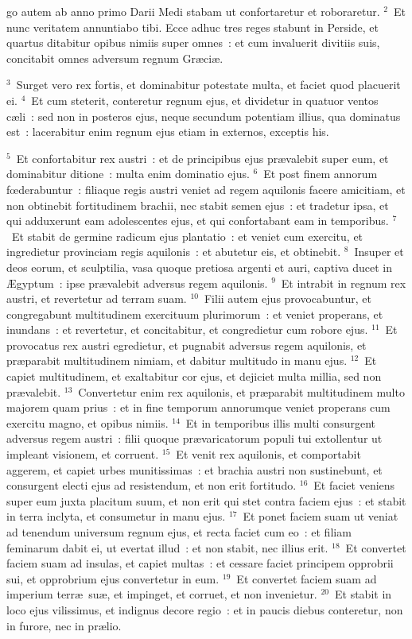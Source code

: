 \bchapter
{}go autem ab anno primo Darii Medi stabam ut confortaretur et roboraretur.
${}^{2}$~Et nunc veritatem annuntiabo tibi. Ecce adhuc tres reges stabunt in Perside, et quartus ditabitur opibus nimiis super omnes~: et cum invaluerit divitiis suis, concitabit omnes adversum regnum Gr\ae ci\ae .


${}^{3}$~Surget vero rex fortis, et dominabitur potestate multa, et faciet quod placuerit ei.
${}^{4}$~Et cum steterit, conteretur regnum ejus, et dividetur in quatuor ventos c\ae li~: sed non in posteros ejus, neque secundum potentiam illius, qua dominatus est~: lacerabitur enim regnum ejus etiam in externos, exceptis his.


${}^{5}$~Et confortabitur rex austri~: et de principibus ejus pr\ae valebit super eum, et dominabitur ditione~: multa enim dominatio ejus.
${}^{6}$~Et post finem annorum fœderabuntur~: filiaque regis austri veniet ad regem aquilonis facere amicitiam, et non obtinebit fortitudinem brachii, nec stabit semen ejus~: et tradetur ipsa, et qui adduxerunt eam adolescentes ejus, et qui confortabant eam in temporibus.
${}^{7}$~Et stabit de germine radicum ejus plantatio~: et veniet cum exercitu, et ingredietur provinciam regis aquilonis~: et abutetur eis, et obtinebit.
${}^{8}$~Insuper et deos eorum, et sculptilia, vasa quoque pretiosa argenti et auri, captiva ducet in \AE gyptum~: ipse pr\ae valebit adversus regem aquilonis.
${}^{9}$~Et intrabit in regnum rex austri, et revertetur ad terram suam.
${}^{10}$~Filii autem ejus provocabuntur, et congregabunt multitudinem exercituum plurimorum~: et veniet properans, et inundans~: et revertetur, et concitabitur, et congredietur cum robore ejus.
${}^{11}$~Et provocatus rex austri egredietur, et pugnabit adversus regem aquilonis, et pr\ae parabit multitudinem nimiam, et dabitur multitudo in manu ejus.
${}^{12}$~Et capiet multitudinem, et exaltabitur cor ejus, et dejiciet multa millia, sed non pr\ae valebit.
${}^{13}$~Convertetur enim rex aquilonis, et pr\ae parabit multitudinem multo majorem quam prius~: et in fine temporum annorumque veniet properans cum exercitu magno, et opibus nimiis.
${}^{14}$~Et in temporibus illis multi consurgent adversus regem austri~: filii quoque pr\ae varicatorum populi tui extollentur ut impleant visionem, et corruent.
${}^{15}$~Et venit rex aquilonis, et comportabit aggerem, et capiet urbes munitissimas~: et brachia austri non sustinebunt, et consurgent electi ejus ad resistendum, et non erit fortitudo.
${}^{16}$~Et faciet veniens super eum juxta placitum suum, et non erit qui stet contra faciem ejus~: et stabit in terra inclyta, et consumetur in manu ejus.
${}^{17}$~Et ponet faciem suam ut veniat ad tenendum universum regnum ejus, et recta faciet cum eo~: et filiam feminarum dabit ei, ut evertat illud~: et non stabit, nec illius erit.
${}^{18}$~Et convertet faciem suam ad insulas, et capiet multas~: et cessare faciet principem opprobrii sui, et opprobrium ejus convertetur in eum.
${}^{19}$~Et convertet faciem suam ad imperium terr\ae\ su\ae , et impinget, et corruet, et non invenietur.
${}^{20}$~Et stabit in loco ejus vilissimus, et indignus decore regio~: et in paucis diebus conteretur, non in furore, nec in pr\ae lio.


